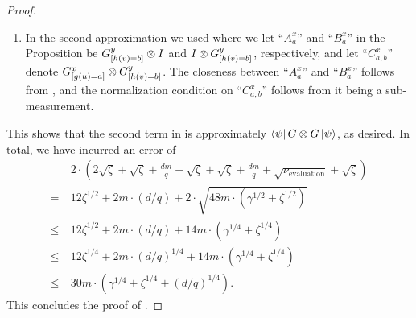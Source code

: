 \begin{proof}
\begin{enumerate}
\item
In the second approximation we used  where we let ``$A^x_a$'' and ``$B^x_a$'' in the Proposition be $G^y_{[h(v)=b]} \otimes I$ and $I \otimes G^y_{[h(v)=b]}$, respectively, and let ``$C^x_{a,b}$'' denote $G^x_{[g(u)=a]} \otimes G^y_{[h(v)=b]}$. The closeness between ``$A^x_a$'' and ``$B^x_a$'' follows from , and the normalization condition on ``$C^x_{a,b}$'' follows from it being a sub-measurement.
\end{enumerate}
This shows that the second term in  is approximately $\bra{\psi} G \otimes G \ket{\psi}$, as desired.
In total, we have incurred an error of
\begin{align*}
&2\cdot\left(2\sqrt{\zeta} +\sqrt{\zeta} + \frac{dm}{q} + \sqrt{\zeta} + \sqrt{\zeta} + \frac{dm}{q} + \sqrt{\nu_{\mathrm{evaluation}}} + \sqrt{\zeta} \right)\\
=~&12 \zeta^{1/2} + 2 m \cdot (d/q) + 2 \cdot \sqrt{48 m \cdot (\gamma^{1/2} + \zeta^{1/2})}\\
\leq~&12 \zeta^{1/2} + 2 m \cdot (d/q) + 14m \cdot \left(\gamma^{1/4} + \zeta^{1/4}\right)\\
\leq~& 12 \zeta^{1/4} + 2m \cdot (d/q)^{1/4} + 14m \cdot \left(\gamma^{1/4} + \zeta^{1/4}\right) \\
\leq~& 30m \cdot \left(\gamma^{1/4}+ \zeta^{1/4} + (d/q)^{1/4}  \right).
\end{align*}
  This concludes the proof of .
\end{proof}


